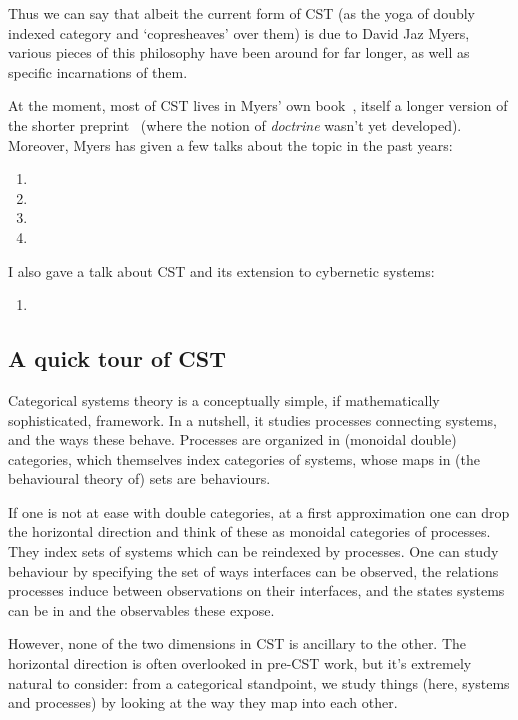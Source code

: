 Thus we can say that albeit the current form of CST (as the yoga of doubly indexed category and `copresheaves' over them) is due to David Jaz Myers, various pieces of this philosophy have been around for far longer, as well as specific incarnations of them.

At the moment, most of CST lives in Myers' own book~\cite{myers_categorical_2022}, itself a longer version of the shorter preprint~\cite{myers_double_2020} (where the notion of \emph{doctrine} wasn't yet developed).
Moreover, Myers has given a few talks about the topic in the past years:
\begin{enumerate}
	\item {}
	\item {}
	\item {}
	\item {}
\end{enumerate}
I also gave a talk about CST and its extension to cybernetic systems:
\begin{enumerate}[resume]
	\item {}
\end{enumerate}

\subsection{A quick tour of CST}
Categorical systems theory is a conceptually simple, if mathematically sophisticated, framework.
In a nutshell, it studies processes connecting systems, and the ways these behave. Processes are organized in (monoidal double) categories, which themselves index categories of systems, whose maps in (the behavioural theory of) sets are behaviours.

If one is not at ease with double categories, at a first approximation one can drop the horizontal direction and think of these as monoidal categories of processes. They index sets of systems which can be reindexed by processes. One can study behaviour by specifying the set of ways interfaces can be observed, the relations processes induce between observations on their interfaces, and the states systems can be in and the observables these expose.

However, none of the two dimensions in CST is ancillary to the other.
The horizontal direction is often overlooked in pre-CST work, but it's extremely natural to consider: from a categorical standpoint, we study things (here, systems and processes) by looking at the way they map into each other.

